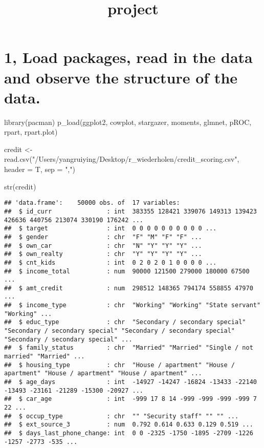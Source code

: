\documentclass[
]{article}
\title{project}
\author{}
\date{\vspace{-2.5em}}
\newenvironment{Shaded}{\begin{snugshade}}{\end{snugshade}}
\newcommand{\AttributeTok}[1]{\textcolor[rgb]{0.77,0.63,0.00}{#1}}
\newcommand{\FunctionTok}[1]{\textcolor[rgb]{0.00,0.00,0.00}{#1}}
\newcommand{\NormalTok}[1]{#1}
\newcommand{\OtherTok}[1]{\textcolor[rgb]{0.56,0.35,0.01}{#1}}
\newcommand{\StringTok}[1]{\textcolor[rgb]{0.31,0.60,0.02}{#1}}
\begin{document}
\maketitle

\hypertarget{load-packages-read-in-the-data-and-observe-the-structure-of-the-data.}{%
\section{1, Load packages, read in the data and observe the structure of
the
data.}\label{load-packages-read-in-the-data-and-observe-the-structure-of-the-data.}}

\begin{Shaded}
\begin{Highlighting}[]
\FunctionTok{library}\NormalTok{(pacman)}
\FunctionTok{p\_load}\NormalTok{(ggplot2,}
\NormalTok{      cowplot,}
\NormalTok{      stargazer,}
\NormalTok{      moments,}
\NormalTok{      glmnet,}
\NormalTok{      pROC,}
\NormalTok{      rpart,}
\NormalTok{      rpart.plot)}

\NormalTok{credit }\OtherTok{\textless{}{-}} \FunctionTok{read.csv}\NormalTok{(}\StringTok{"/Users/yangruiying/Desktop/r\_wiederholen/credit\_scoring.csv"}\NormalTok{, }\AttributeTok{header =}\NormalTok{ T, }\AttributeTok{sep =} \StringTok{","}\NormalTok{)}

\FunctionTok{str}\NormalTok{(credit)}
\end{Highlighting}
\end{Shaded}

\begin{verbatim}
## 'data.frame':    50000 obs. of  17 variables:
##  $ id_curr               : int  383355 128421 339076 149313 139423 426636 440756 213074 330190 176242 ...
##  $ target                : int  0 0 0 0 0 0 0 0 0 0 ...
##  $ gender                : chr  "F" "M" "F" "F" ...
##  $ own_car               : chr  "N" "Y" "Y" "Y" ...
##  $ own_realty            : chr  "Y" "Y" "Y" "Y" ...
##  $ cnt_kids              : int  0 2 0 2 0 1 0 0 0 0 ...
##  $ income_total          : num  90000 121500 279000 180000 67500 ...
##  $ amt_credit            : num  298512 148365 794174 558855 47970 ...
##  $ income_type           : chr  "Working" "Working" "State servant" "Working" ...
##  $ educ_type             : chr  "Secondary / secondary special" "Secondary / secondary special" "Secondary / secondary special" "Secondary / secondary special" ...
##  $ family_status         : chr  "Married" "Married" "Single / not married" "Married" ...
##  $ housing_type          : chr  "House / apartment" "House / apartment" "House / apartment" "House / apartment" ...
##  $ age_days              : int  -14927 -14247 -16824 -13433 -22140 -13493 -23161 -21289 -15300 -20927 ...
##  $ car_age               : int  -999 17 8 14 -999 -999 -999 -999 7 22 ...
##  $ occup_type            : chr  "" "Security staff" "" "" ...
##  $ ext_source_3          : num  0.792 0.614 0.633 0.129 0.519 ...
##  $ days_last_phone_change: int  0 0 -2325 -1750 -1895 -2709 -1226 -1257 -2773 -535 ...
\end{verbatim}
\end{document}
